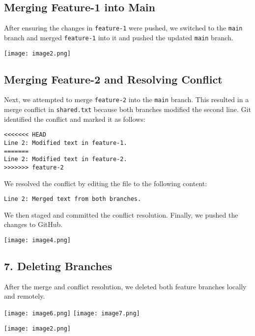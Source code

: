 \documentclass[a4paper,12pt]{article}
\begin{document}
\subsection{Merging Feature-1 into Main}
After ensuring the changes in \texttt{feature-1} were pushed, we switched to the \texttt{main} branch and merged \texttt{feature-1} into it and pushed the updated \texttt{main} branch.

\begin{center}
\texttt{[image: image2.png]} 
    \vspace{0.5cm}
\end{center}
\subsection{Merging Feature-2 and Resolving Conflict}
Next, we attempted to merge \texttt{feature-2} into the \texttt{main} branch. This resulted in a merge conflict in \texttt{shared.txt} because both branches modified the second line. Git identified the conflict and marked it as follows:
\begin{verbatim}
<<<<<<< HEAD
Line 2: Modified text in feature-1.
=======
Line 2: Modified text in feature-2.
>>>>>>> feature-2
\end{verbatim}
We resolved the conflict by editing the file to the following content:
\begin{verbatim}
Line 2: Merged text from both branches.
\end{verbatim}
We then staged and committed the conflict resolution. Finally, we pushed the changes to GitHub.\\

\begin{center}
     \texttt{[image: image4.png]} 
    \vspace{0.5cm}
\end{center}

\subsection*{7. Deleting Branches}
After the merge and conflict resolution, we deleted both feature branches locally and remotely.
\begin{center}
 \texttt{[image: image6.png]}
    \vspace{0.5cm}
     \texttt{[image: image7.png]}
    \vspace{0.5cm}
\end{center}
\begin{center}
\texttt{[image: image2.png]} 
    \vspace{0.5cm}
\end{center}
\end{document}
